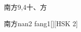 \begin{entry}{南方}{9,4}{⼗、⽅}
  \begin{phonetics}{南方}{nan2 fang1}[][HSK 2]
  \end{phonetics}
\end{entry}
